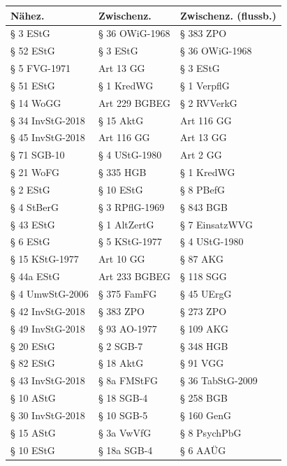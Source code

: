 \begin{tabular}{lll}
\toprule
          Nähez. &     Zwischenz. & Zwischenz. (flussb.) \\
\midrule
        § 3 EStG & § 36 OWiG-1968 &            § 383 ZPO \\
       § 52 EStG &       § 3 EStG &       § 36 OWiG-1968 \\
    § 5 FVG-1971 &      Art 13 GG &             § 3 EStG \\
       § 51 EStG &     § 1 KredWG &          § 1 VerpflG \\
       § 14 WoGG &  Art 229 BGBEG &          § 2 RVVerkG \\
§ 34 InvStG-2018 &      § 15 AktG &           Art 116 GG \\
§ 45 InvStG-2018 &     Art 116 GG &            Art 13 GG \\
     § 71 SGB-10 &  § 4 UStG-1980 &             Art 2 GG \\
       § 21 WoFG &      § 335 HGB &           § 1 KredWG \\
        § 2 EStG &      § 10 EStG &            § 8 PBefG \\
      § 4 StBerG & § 3 RPflG-1969 &            § 843 BGB \\
       § 43 EStG &   § 1 AltZertG &       § 7 EinsatzWVG \\
        § 6 EStG &  § 5 KStG-1977 &        § 4 UStG-1980 \\
  § 15 KStG-1977 &      Art 10 GG &             § 87 AKG \\
      § 44a EStG &  Art 233 BGBEG &            § 118 SGG \\
 § 4 UmwStG-2006 &    § 375 FamFG &           § 45 UErgG \\
§ 42 InvStG-2018 &      § 383 ZPO &            § 273 ZPO \\
§ 49 InvStG-2018 &   § 93 AO-1977 &            § 109 AKG \\
       § 20 EStG &      § 2 SGB-7 &            § 348 HGB \\
       § 82 EStG &      § 18 AktG &             § 91 VGG \\
§ 43 InvStG-2018 &    § 8a FMStFG &     § 36 TabStG-2009 \\
       § 10 AStG &     § 18 SGB-4 &            § 258 BGB \\
§ 30 InvStG-2018 &     § 10 SGB-5 &           § 160 GenG \\
       § 15 AStG &     § 3a VwVfG &         § 8 PsychPbG \\
       § 10 EStG &    § 18a SGB-4 &             § 6 AAÜG \\
\bottomrule
\end{tabular}
